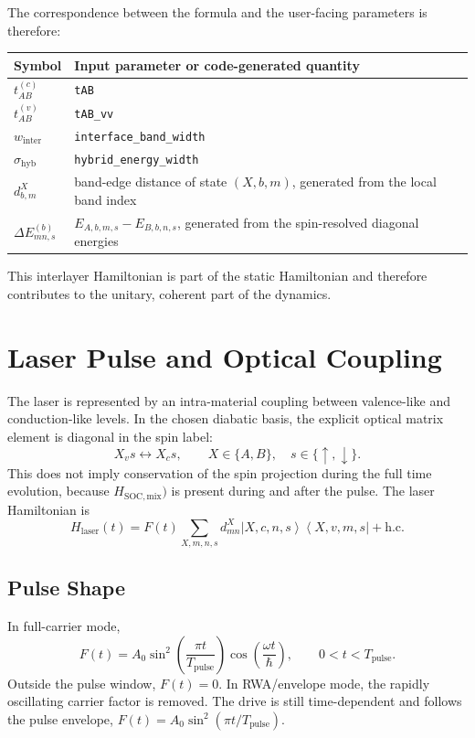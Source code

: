 \documentclass[11pt,a4paper]{article}
\newcommand{\ket}[1]{\left|#1\right\rangle}
\newcommand{\bra}[1]{\left\langle #1\right|}
\begin{document}
The correspondence between the formula and the user-facing parameters is therefore:
\begin{center}
\begin{tabular}{ll}
\toprule
Symbol & Input parameter or code-generated quantity \\
\midrule
\(t^{(c)}_{AB}\) & \texttt{tAB} \\
\(t^{(v)}_{AB}\) & \texttt{tAB\_vv} \\
\(w_{\mathrm{inter}}\) & \texttt{interface\_band\_width} \\
\(\sigma_{\mathrm{hyb}}\) & \texttt{hybrid\_energy\_width} \\
\(d^{X}_{b,m}\) & band-edge distance of state \((X,b,m)\), generated from the local band index \\
\(\Delta E^{(b)}_{mn,s}\) & \(E_{A,b,m,s}-E_{B,b,n,s}\), generated from the spin-resolved diagonal energies \\
\bottomrule
\end{tabular}
\end{center}

This interlayer Hamiltonian is part of the static Hamiltonian and therefore contributes to the unitary, coherent part of the dynamics.

\section{Laser Pulse and Optical Coupling}

The laser is represented by an intra-material coupling between valence-like and conduction-like levels.  
In the chosen diabatic basis, the explicit optical matrix element is diagonal in the spin label:
\begin{equation}
X_v s \leftrightarrow X_c s,
\qquad
X\in\{A,B\},\quad s\in\{\uparrow,\downarrow\}.
\end{equation}
This does not imply conservation of the spin projection during the full time evolution, because $H_{\mathrm{SOC,mix}})$ is present during and after the pulse.
The laser Hamiltonian is
\begin{equation}
H_{\mathrm{laser}}(t)
=
F(t)
\sum_{X,m,n,s}
 d^X_{mn}
\ket{X,c,n,s}\bra{X,v,m,s}
+\mathrm{h.c.}
\end{equation}

\subsection{Pulse Shape}

In full-carrier mode,
\begin{equation}
F(t)=A_0
\sin^2\left(\frac{\pi t}{T_{\mathrm{pulse}}}\right)
\cos\left(\frac{\omega t}{\hbar}\right),
\qquad
0<t<T_{\mathrm{pulse}}.
\end{equation}
Outside the pulse window, $F(t)=0$.  In RWA/envelope mode, the rapidly oscillating carrier factor is removed. The drive is still time-dependent and follows the pulse envelope, \(F(t)=A_0\sin^2(\pi t/T_{\mathrm{pulse}})\).
\end{document}

